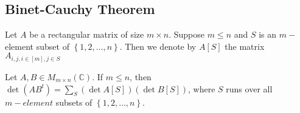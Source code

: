 \documentclass[../main.tex]{subfiles}
\begin{document}
\subsection{Binet-Cauchy Theorem}
Let $A $ be a rectangular matrix of size $m \times n$. Suppose $m \leq n$ and $S$ is an $m-$ element subset of $\left\{ 1,2, \ldots, n \right\} $. Then we denote by $A[S]$ the matrix $A_{i,j, i \in [ m] , j \in S} $
\begin{thm}
	Let $A,B \in M_{m\times n} ( \mathbb{C}) $. If $m \leq n$, then $\det ( A B ^{t}) = \sum_{S}^{ } ( \det A[S]) ( \det B[S]) $, where $S$ runs over all $m-element$ subsets of $ \left\{ 1, 2, \ldots, n \right\} $.
\end{thm}
\end{document}
